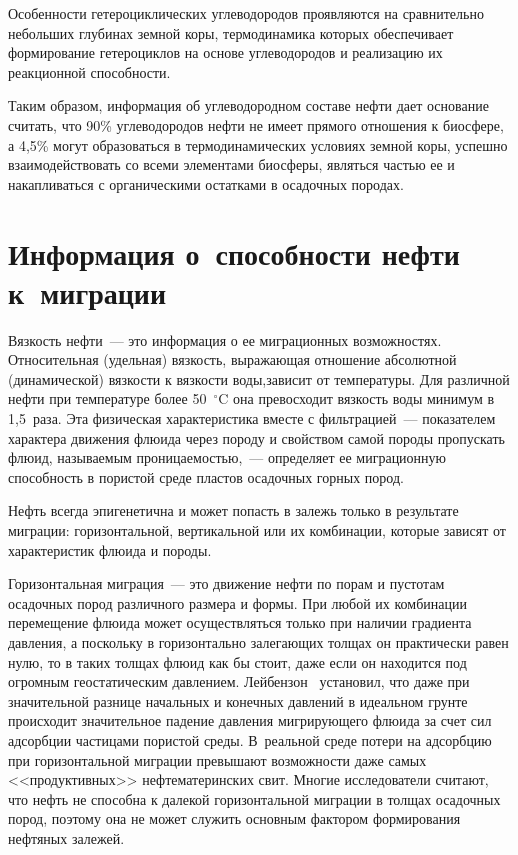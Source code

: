 \begin{multicols}{2}
     Особенности гетероциклических углеводородов проявляются на сравнительно 
небольших глубинах земной коры, термодинамика которых обеспечивает 
формирование гетероциклов на основе углеводородов и реализацию их 
реакционной способности. 
     
     Таким образом, информация об углеводородном составе нефти дает 
основание считать, что 90\% углеводородов нефти не имеет прямого отношения к 
биосфере, а 4,5\% могут образоваться в термодинамических условиях земной коры, 
успешно взаимодействовать со всеми элементами биосферы, являться частью ее и 
накапливаться с органическими остатками в осадочных породах. 
     
\section{Информация о~способности нефти к~миграции}

     Вязкость нефти~--- это информация о ее миг\-ра\-ци\-он\-ных возможностях. 
Относительная (удельная) вязкость, выражающая отношение абсолютной 
(динамической) вязкости к вязкости воды,\linebreak зависит от температуры. Для различной 
нефти при температуре более 50~$^\circ$C она превосходит вязкость воды 
минимум в 1,5~раза. Эта физическая характеристика вместе с фильтрацией~--- 
показателем характера движения флюида через породу и свойством самой породы 
пропускать флюид, называемым проницаемостью,~--- определяет ее 
миг\-ра\-ци\-он\-ную способность в пористой среде пластов осадочных горных пород. 
     
     Нефть всегда эпигенетична и может попасть в залежь только в результате 
миграции: горизонтальной, вертикальной или их комбинации, которые зависят от 
характеристик флюида и породы.
     
     Горизонтальная миграция~--- это движение нефти по порам и пустотам 
осадочных пород различного размера и формы. При любой их комбинации 
перемещение флюида может осуществляться только при наличии градиента 
давления, а поскольку в горизонтально залегающих толщах он практически равен 
нулю, то в таких толщах флюид как бы стоит, даже если он находится под 
огромным геостатическим давлением. Лейбензон~\cite{12s} установил, что 
даже при значительной разнице начальных и конечных давлений в идеальном 
грунте происходит значительное падение давления мигрирующего флюида за счет 
сил адсорбции частицами пористой среды. В~реальной среде потери на адсорбцию 
при горизонтальной миграции превышают возможности даже самых 
<<продуктивных>> нефтематеринских свит. Многие исследователи считают, что 
нефть не способна к далекой горизонтальной миграции в толщах осадочных пород, 
поэтому она не может служить основным фактором формирования нефтяных 
залежей. 
     

\end{multicols}
